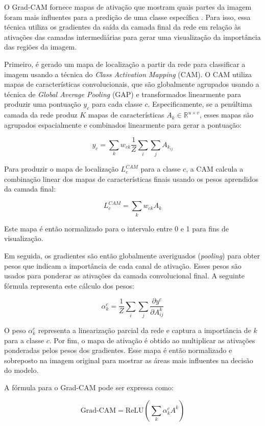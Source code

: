 O Grad-CAM fornece mapas de ativação que mostram quais partes da imagem foram mais influentes para a predição de uma classe específica \cite{Selvaraju2016}. Para isso, essa técnica utiliza os gradientes da saída da camada final da rede em relação às ativações das camadas intermediárias para gerar uma visualização da importância das regiões da imagem.

Primeiro, é gerado um mapa de localização a partir da rede para classificar a imagem usando a técnica do \textit{Class Activation Mapping} (CAM). O CAM utiliza mapas de características convolucionais, que são globalmente agrupados usando a técnica de \textit{Global Average Pooling} (GAP) e transformados linearmente para produzir uma pontuação \( y_c \) para cada classe \( c \). Especificamente, se a penúltima camada da rede produz \( K \) mapas de características \( A_k \in \mathbb{R}^{u \times v} \), esses mapas são agrupados espacialmente e combinados linearmente para gerar a pontuação:

\[
y_c = \sum_k w_{ck} \frac{1}{Z} \sum_i \sum_j A_{k_{ij}}
\]

Para produzir o mapa de localização \( L_c^{CAM} \) para a classe \( c \), a CAM calcula a combinação linear dos mapas de características finais usando os pesos aprendidos da camada final:

\[
L_c^{CAM} = \sum_k w_{ck} A_k
\]

Este mapa é então normalizado para o intervalo entre 0 e 1 para fins de visualização.

Em seguida, os gradientes são então globalmente averiguados (\textit{pooling}) para obter pesos que indicam a importância de cada canal de ativação. Esses pesos são usados para ponderar as ativações da camada convolucional final. A seguinte fórmula representa este cálculo dos pesos:

\[
\alpha_{k}^{c} = \frac{1}{Z} \sum_i \sum_j \frac{\partial y^{c}}{\partial A_{ij}^{k}}
\]

O peso \( \alpha_{k}^{c} \) representa a linearização parcial da rede e captura a importância de \(k \) para a classe \(c \). Por fim, o mapa de ativação é obtido ao multiplicar as ativações ponderadas pelos pesos dos gradientes. Esse mapa é então normalizado e sobreposto na imagem original para mostrar as áreas mais influentes na decisão do modelo.

A fórmula para o Grad-CAM pode ser expressa como:

\[
\text{Grad-CAM} = \text{ReLU} \left( \sum_{k} \alpha_{k}^{c} A^{k} \right)
\]
